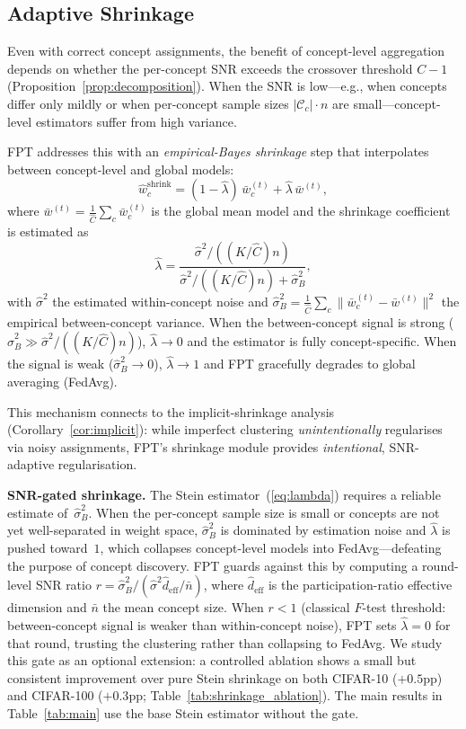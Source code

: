 \documentclass[11pt]{article}
\newcommand{\cC}{\mathcal{C}}
\newcommand{\what}{\hat{w}}
\newcommand{\wbar}{\bar{w}}
\begin{document}
\subsection{Adaptive Shrinkage}
\label{sec:shrinkage}

Even with correct concept assignments, the benefit of concept-level aggregation depends on whether the per-concept SNR exceeds the crossover threshold $C{-}1$ (Proposition~\ref{prop:decomposition}).
When the SNR is low---e.g., when concepts differ only mildly or when per-concept sample sizes $|\cC_c| \cdot n$ are small---concept-level estimators suffer from high variance.

FPT addresses this with an \emph{empirical-Bayes shrinkage} step that interpolates between concept-level and global models:
\begin{equation}
\what_c^{\mathrm{shrink}} = (1 - \hat\lambda)\,\wbar_c^{(t)} + \hat\lambda\,\wbar^{(t)},
\label{eq:shrinkage}
\end{equation}
where $\wbar^{(t)} = \frac{1}{\hat C}\sum_c \wbar_c^{(t)}$ is the global mean model and the shrinkage coefficient is estimated as
\begin{equation}
\hat\lambda = \frac{\hat\sigma^2 / ((K/\hat C)n)}{\hat\sigma^2 / ((K/\hat C)n) + \hat\sigma_B^2},
\label{eq:lambda}
\end{equation}
with $\hat\sigma^2$ the estimated within-concept noise and $\hat\sigma_B^2 = \frac{1}{\hat C}\sum_c \|\wbar_c^{(t)} - \wbar^{(t)}\|^2$ the empirical between-concept variance.
When the between-concept signal is strong ($\hat\sigma_B^2 \gg \hat\sigma^2 / ((K/\hat C)n)$), $\hat\lambda \to 0$ and the estimator is fully concept-specific.
When the signal is weak ($\hat\sigma_B^2 \to 0$), $\hat\lambda \to 1$ and FPT gracefully degrades to global averaging (FedAvg).

This mechanism connects to the implicit-shrinkage analysis (Corollary~\ref{cor:implicit}): while imperfect clustering \emph{unintentionally} regularises via noisy assignments, FPT's shrinkage module provides \emph{intentional}, SNR-adaptive regularisation.

\textbf{SNR-gated shrinkage.}
The Stein estimator~(\ref{eq:lambda}) requires a reliable estimate of~$\hat\sigma_B^2$.
When the per-concept sample size is small or concepts are not yet well-separated in weight space, $\hat\sigma_B^2$ is dominated by estimation noise and $\hat\lambda$ is pushed toward~$1$, which collapses concept-level models into FedAvg---defeating the purpose of concept discovery.
FPT guards against this by computing a round-level SNR ratio $r = \hat\sigma_B^2 / (\hat\sigma^2 \hat d_{\mathrm{eff}} / \bar n)$, where $\hat d_{\mathrm{eff}}$ is the participation-ratio effective dimension and $\bar n$ the mean concept size.
When $r < 1$ (classical $F$-test threshold: between-concept signal is weaker than within-concept noise), FPT sets $\hat\lambda = 0$ for that round, trusting the clustering rather than collapsing to FedAvg.
We study this gate as an optional extension: a controlled ablation shows a small but consistent improvement over pure Stein shrinkage on both CIFAR-10 ($+0.5$pp) and CIFAR-100 ($+0.3$pp; Table~\ref{tab:shrinkage_ablation}). The main results in Table~\ref{tab:main} use the base Stein estimator without the gate.
\end{document}
